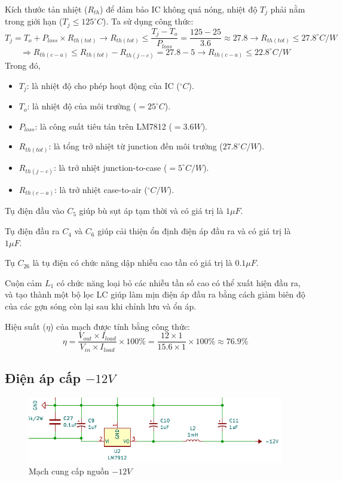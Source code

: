 Kích thước tản nhiệt ($R_{th}$) để đảm bảo IC không quá nóng, nhiệt độ $T_j$ phải nằm trong giới hạn ($T_j \leq 125^{\circ}C$). Ta sử dụng công thức: \[ T_{j} = T_{o} + P_{loss} \times R_{th(tot)} \rightarrow R_{th(tot)} \leq \dfrac{T_{j} - T_{o}}{P_{loss}} = \dfrac{125 - 25}{3.6} \approx 27.8 \rightarrow R_{th(tot)} \leq 27.8^{\circ}C/W
 \]
 \[ \Rightarrow R_{th(c-a)} \leq R_{th(tot)} - R_{th(j-c)} = 27.8 - 5 \rightarrow R_{th(c-a)} \leq 22.8^{\circ}C/W \]
Trong đó,
\begin{itemize}[label = -]
	\item $T_{j}$: là nhiệt độ cho phép hoạt động của IC ($ ^\circ C$).
	\item $T_{o}$: là nhiệt độ của môi trường ($=25^{\circ}C$).
	\item $P_{loss}$: là công suất tiêu tán trên LM7812 ($=3.6W$).
	\item $R_{th(tot)}$: là tổng trở nhiệt từ junction đến môi trường ($27.8^{\circ}C/W$).
	\item $R_{th(j-c)}$: là trở nhiệt junction-to-case ($=5^{\circ}C/W$).
	\item $R_{th(c-a)}$: là trở nhiệt case-to-air ($^{\circ}C/W$).
\end{itemize}

Tụ điện đầu vào $C_{5}$ giúp bù sụt áp tạm thời và có giá trị là $1\mu F$.

Tụ điện đầu ra $C_{4}$ và $C_6$ giúp cải thiện ổn định điện áp đầu ra và có giá trị là $1\mu F$.

Tụ $C_{26}$ là tụ điện có chức năng dập nhiễu cao tần có giá trị là $0.1\mu F$.

Cuộn cảm $L_{1}$ có chức năng loại bỏ các nhiễu tần số cao có thể xuất hiện đầu ra, và tạo thành một bộ lọc LC giúp làm mịn điện áp đầu ra bằng cách giảm biên độ của các gợn sóng còn lại sau khi chỉnh lưu và ổn áp.

Hiệu suất ($\eta$) của mạch được tính bằng công thức: \[ \eta = \dfrac{V_{out}\times I_{load}}{V_{in} \times I_{load}}\times 100\% = \dfrac{12\times 1}{15.6 \times 1}\times 100\% \approx 76.9\% \]

\subsection{Điện áp cấp $-12V$}

\begin{figure}[H]
	\centering
	\includegraphics[width=0.6\linewidth]{./picture/supply_-12V.pdf}
	\caption{Mạch cung cấp nguồn $-12V$}
	\label{f_powersupply_-12V}
\end{figure}

